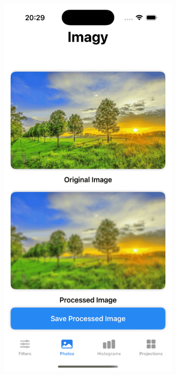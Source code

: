 \documentclass[a4paper]{article}
\begin{document}
\begin{figure}[H]
    \centering
    \begin{subfigure}{0.2\textwidth}
        \centering
        \includegraphics[width=\linewidth]{images/trees_gaussian_7_1.8.png}

\end{subfigure}
\end{figure}
\end{document}
